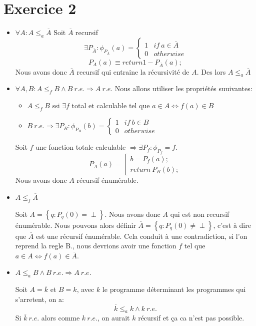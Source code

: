 \documentclass[a4paper, 11pt, onecolumn]{article}
\begin{document}
\section*{Exercice 2}
\begin{itemize}
	\item[(a)] $\forall A: A\leq_a \overline{A}$
	Soit $\overline{A}$ recursif
	$$\exists P_{\overline{A}} : \phi_{P_{\overline{A}}}(a) = 
	\left\{
	\begin{array}{ll}
	1 & if\ a \in \overline{A} \\
	0 & otherwise
	\end{array}
	\right.
	$$
	$$P_A(a) \equiv return 1 - P_{\overline{A}}(a);$$
	Nous avons donc $\overline{A}$ recursif qui entraine la récursivité de $A$. Des lors
 $A\leq_a \overline{A}$
	\item[(b)] $\forall A,B: A \leq_f B \land B \ r.e. \Rightarrow A \ r.e.$
	Nous allons utiliser les propriétés suuivantes:
	\begin{itemize}
	\item $A \leq_f B$ ssi $\exists f$ total et calculable tel que $a \in A \Leftrightarrow f(a) \in B$
	\item $B \ r.e. \Rightarrow \exists P_B : \phi_{P_B}(b) = 
	\left\{
	\begin{array}{ll}
	1 & if \ b \in B \\
	0 & otherwise
	\end{array}
	\right.$
	\end{itemize}
	Soit $f$ une fonction totale calculable $\Rightarrow \exists P_f : \phi_{P_f} = f$.
	$$P_A(a)=\left[\begin{array}{l}b = P_f(a);\\ return\ P_B(b);\end{array}\right.$$
	Nous avons donc $A$ récursif énumérable.
	\item[(c)] $A \leq_f \overline{A}$
	
	Soit $A = \left\{q : P_q(0) = \perp\right\}$. Nous avons donc $A$ qui est non recursif énumérable. Nous pouvons alors définir $\overline{A} = \left\{q : P_q(0) \neq \perp\right\}$, c'est à dire que $\overline{A}$ est une récursif énumérable. Cela conduit à une contradiction, si l'on reprend la regle \textsc{B.}, nous devrions avoir une fonction $f$ tel que $a \in A \Leftrightarrow f(a) \in \overline{A}$.

	\item[(d)] $A \leq_a B \land B \ r.e. \Rightarrow A \ r.e.$

	Soit $A = \overline{k}$ et $B = k$, avec $k$ le programme déterminant les programmes qui s'arretent, on a:
	$$\overline{k} \leq_a k \land k \ r.e.$$
	Si $\overline{k} \ r.e.$ alors comme $k \ r.e.$, on aurait $k$ récursif et ça ca n'est pas possible.
\end{itemize}
\end{document}
